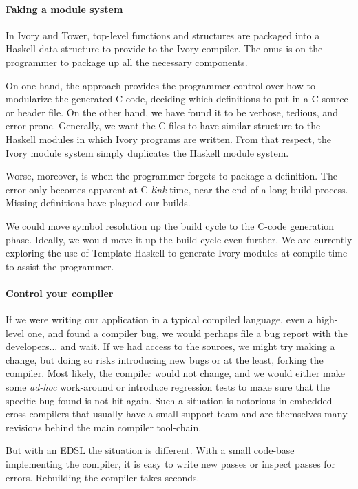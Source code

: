 \paragraph{Faking a module system}
In Ivory and Tower, top-level functions and structures are packaged into a
Haskell data structure to provide to the Ivory compiler.  The onus is on the
programmer to package up all the necessary components.

On one hand, the approach provides the programmer control over how to
modularize the generated C code, deciding which definitions to put in a C
source or header file.  On the other hand, we have found it to be verbose,
tedious, and error-prone.  Generally, we want the C files to have similar
structure to the Haskell modules in which Ivory programs are written.  From that
respect, the Ivory module system simply duplicates the Haskell module system.

Worse, moreover, is when the programmer forgets to package a definition.  The
error only becomes apparent at C \emph{link} time, near the end of a long build
process.  Missing definitions have plagued our builds.

We could move symbol resolution up the build cycle to the C-code generation
phase.  Ideally, we would move it up the build cycle even further.  We are
currently exploring the use of Template Haskell to generate Ivory modules at
compile-time to assist the programmer.

\paragraph{Control your compiler}
If we were writing our application in a typical compiled language, even a
high-level one, and found a compiler bug, we would perhaps file a bug report
with the developers... and wait.  If we had access to the sources, we might try
making a change, but doing so risks introducing new bugs or at the least, forking
the compiler.  Most likely, the compiler would not change, and we would either
make some \emph{ad-hoc} work-around or introduce regression tests to make sure
that the specific bug found is not hit again.  Such a situation is notorious in
embedded cross-compilers that usually have a small support team and are
themselves many revisions behind the main compiler tool-chain.

But with an EDSL the situation is different.  With a small code-base
implementing the compiler, it is easy to write new passes or inspect passes for
errors.  Rebuilding the compiler takes seconds.

